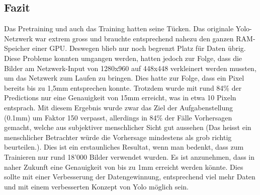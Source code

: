 \subsection*{Fazit}

Das Pretraining und auch das Training hatten seine Tücken.
Das originale Yolo-Netzwerk war extrem gross und brauchte entsprechend nahezu den ganzen RAM-Speicher einer GPU.
Deswegen blieb nur noch begrenzt Platz für Daten übrig. 
Diese Probleme konnten umgangen werden, hatten jedoch zur Folge, dass die Bilder am Netzwerk-Input von 1280x960 auf 448x448 verkleinert werden mussten, um das Netzwerk zum Laufen zu bringen. 
Dies hatte zur Folge, dass ein Pixel bereits bis zu 1,5mm entsprechen konnte.
Trotzdem wurde mit rund 84\% der Predictions nur eine Genauigkeit von 15mm erreicht, was in etwa 10 Pixeln entsprach. 
Mit diesem Ergebnis wurde zwar das Ziel der Aufgabenstellung (0.1mm) um Faktor 150 verpasst, allerdings in 84\% der Fälle Vorhersagen gemacht, welche aus subjektiver menschlicher Sicht \grqq{}gut\grqq{} aussehen (Das heisst ein menschlicher Betrachter würde die Vorhersage mindestens als grob richtig beurteilen.). 
Dies ist ein erstaunliches Resultat, wenn man bedenkt, dass zum Trainieren nur rund 18'000 Bilder verwendet wurden. 
Es ist anzunehmen, dass in naher Zukunft eine Genauigkeit von bis zu 1mm erreicht werden könnte. 
Dies sollte mit einer Verbesserung der Datengewinnung, entsprechend viel mehr Daten und mit einem verbesserten Konzept von Yolo möglich sein.
